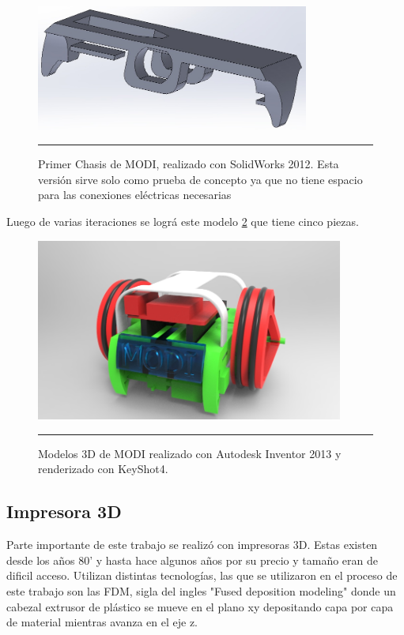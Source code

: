 \begin{figure}[htbp]
	\centering
		\includegraphics[width=0.8\textwidth]{./Figures/MODI/1MODI.jpg}
		\rule{35em}{0.5pt}
	\caption[ModiSolidWorks]{Primer Chasis de MODI, realizado con SolidWorks 2012. Esta versión sirve solo como prueba de concepto ya que no tiene espacio para las conexiones eléctricas necesarias}
	\label{fig:MODISolidWork}
\end{figure}	

Luego de varias iteraciones se lográ este modelo \ref{fig:render3} que tiene cinco piezas. 


\begin{figure}[htbp]
	\centering
		\includegraphics[width=0.9\textwidth]{./Figures/MODI/render3.jpg}
		\rule{35em}{0.5pt}
	\caption[Render]{Modelos 3D de MODI realizado con Autodesk Inventor 2013 y renderizado con KeyShot4. }
	\label{fig:render3}
\end{figure}	

\subsection{Impresora 3D}

Parte importante de este trabajo se realizó con impresoras 3D. Estas existen desde los años 80' y hasta hace algunos años por su precio y tamaño eran de dificil acceso. Utilizan distintas tecnologías, las que se utilizaron en el proceso de este trabajo son las FDM, sigla del ingles "Fused deposition modeling" donde un cabezal extrusor de plástico se mueve en el plano xy depositando capa por capa de material mientras avanza en el eje z.

